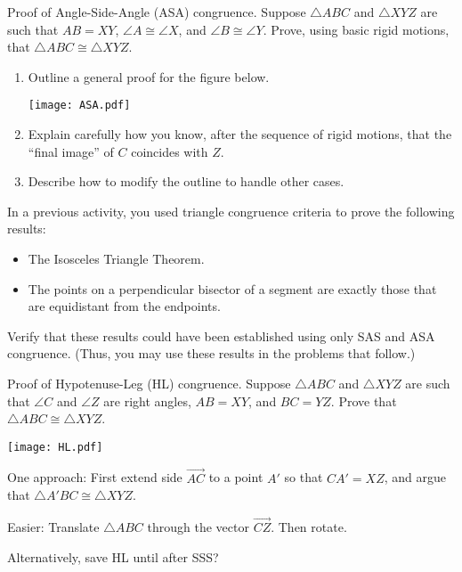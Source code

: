 \documentclass[nooutcomes]{ximera}
\begin{document}
\newpage
\begin{problem}
Proof of Angle-Side-Angle (ASA) congruence.  Suppose $\triangle ABC$ and $\triangle XYZ$ are such that $AB=XY$, $\angle A \cong \angle X$, and $\angle B \cong \angle Y$.  Prove, using basic rigid motions, that $\triangle ABC \cong \triangle XYZ$.  
\begin{enumerate}
\item Outline a general proof for the figure below.  
\begin{image}
\texttt{[image: ASA.pdf]}
\end{image}
\item Explain carefully how you know, after the sequence of rigid motions, that the ``final image'' of $C$ coincides with $Z$.  
\item Describe how to modify the outline to handle other cases. 
\end{enumerate}
\vfill
\end{problem}

\newpage

\begin{problem}
In a previous activity, you used triangle congruence criteria to prove the following results: 
\begin{itemize}
\item The Isosceles Triangle Theorem.
\item The points on a perpendicular bisector of a segment are exactly those that are equidistant from the endpoints.
\end{itemize}
Verify that these results could have been established using only SAS and ASA congruence.  (Thus, you may use these results in the problems that follow.) 
\vspace{1in}
\end{problem}

\begin{problem}
Proof of Hypotenuse-Leg (HL) congruence.  Suppose $\triangle ABC$ and $\triangle XYZ$ are such that $\angle C$ and $\angle Z$ are right angles, $AB=XY$, and $BC=YZ$.  Prove that $\triangle ABC \cong \triangle XYZ$.  
\begin{image}
\texttt{[image: HL.pdf]}
\end{image}
\vfill
\end{problem}

\begin{teachingnote}
One approach:  First extend side $\overrightarrow{AC}$ to a point $A'$ so that $CA'=XZ$, and argue that $\triangle A'BC \cong \triangle XYZ$.

Easier:  Translate $\triangle ABC$ through the vector $\overrightarrow{CZ}$.  Then rotate.

Alternatively, save HL until after SSS?
\end{teachingnote}
\end{document}
